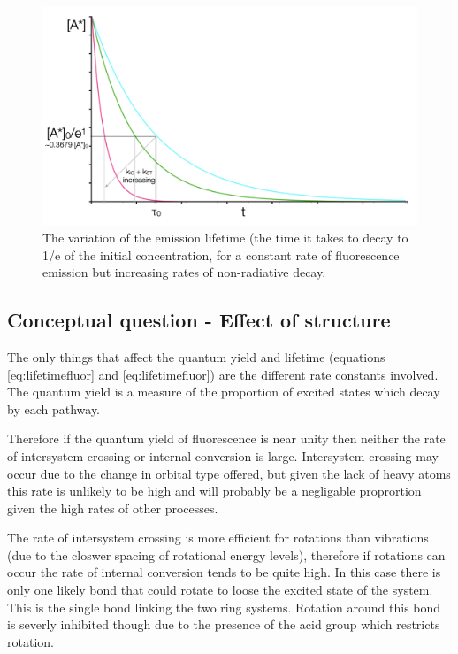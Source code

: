 \documentclass[
]{book}
\begin{document}
\begin{figure}

{\centering \includegraphics[width=0.7\linewidth]{images/rateslifetime} 

}

\caption{The variation of the emission lifetime (the time it takes to decay to 1/e of the initial concentration, for a constant rate of fluorescence emission but increasing rates of non-radiative decay.}\label{fig:rateslifetime}
\end{figure}

\hypertarget{sec:structureans}{%
\subsection{Conceptual question - Effect of structure}\label{sec:structureans}}

The only things that affect the quantum yield and lifetime (equations \eqref{eq:lifetimefluor} and \eqref{eq:lifetimefluor}) are the different rate constants involved. The quantum yield is a measure of the proportion of excited states which decay by each pathway.

Therefore if the quantum yield of fluorescence is near unity then neither the rate of intersystem crossing or internal conversion is large. Intersystem crossing may occur due to the change in orbital type offered, but given the lack of heavy atoms this rate is unlikely to be high and will probably be a negligable proprortion given the high rates of other processes.

The rate of intersystem crossing is more efficient for rotations than vibrations (due to the closwer spacing of rotational energy levels), therefore if rotations can occur the rate of internal conversion tends to be quite high. In this case there is only one likely bond that could rotate to loose the excited state of the system. This is the single bond linking the two ring systems. Rotation around this bond is severly inhibited though due to the presence of the acid group which restricts rotation.
\end{document}
